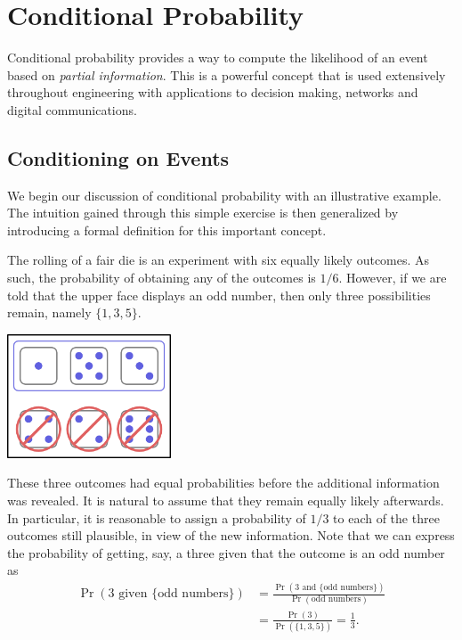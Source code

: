 \chapter{Conditional Probability}
\label{chapter:ConditionalProbability}

Conditional probability provides a way to compute the likelihood of an event based on \emph{partial information}.
This is a powerful concept that is used extensively throughout engineering with applications to decision making, networks and digital communications.


\section{Conditioning on Events}

We begin our discussion of conditional probability with an illustrative example.
The intuition gained through this simple exercise is then generalized by introducing a formal definition for this important concept.

\begin{example}
The rolling of a fair die is an experiment with six equally likely outcomes.
As such, the probability of obtaining any of the outcomes is $1/6$.
However, if we are told that the upper face displays an odd number, then only three possibilities remain, namely $\{1, 3, 5 \}$.

\begin{center}
\includegraphics[height=3.675cm]{Figures/3Chapter/condevent}
\end{center}

These three outcomes had equal probabilities before the additional information was revealed.
It is natural to assume that they remain equally likely afterwards.
In particular, it is reasonable to assign a probability of $1/3$ to each of the three outcomes still plausible, in view of the new information.
Note that we can express the probability of getting, say, a three given that the outcome is an odd number as
\begin{equation*}
\begin{split}
\Pr (\text{3 given } \{ \text{odd numbers} \})
&= \frac{\Pr (\text{3 and } \{ \text{odd numbers} \})}
{\Pr (\text{odd numbers})} \\
&= \frac{\Pr(3)}{\Pr (\{1,3,5\})} = \frac{1}{3} .
\end{split}
\end{equation*}
\end{example}

